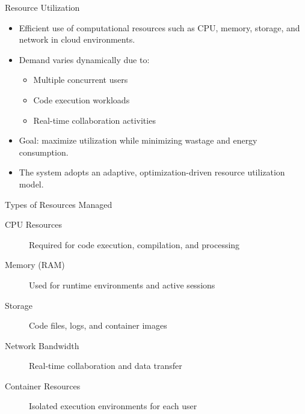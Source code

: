 \documentclass[aspectratio=169,11pt]{beamer}
\begin{document}
\begin{frame}{Resource Utilization}
  \begin{itemize}
    \item Efficient use of computational resources such as CPU, memory, storage, and network in cloud environments.
    \item Demand varies dynamically due to:
      \begin{itemize}
        \item Multiple concurrent users
        \item Code execution workloads
        \item Real-time collaboration activities
      \end{itemize}
    \item Goal: maximize utilization while minimizing wastage and energy consumption.
    \item The system adopts an adaptive, optimization-driven resource utilization model.
  \end{itemize}
\end{frame}

\begin{frame}{Types of Resources Managed}
  \begin{description}
    \item[CPU Resources] Required for code execution, compilation, and processing
    \item[Memory (RAM)] Used for runtime environments and active sessions
    \item[Storage] Code files, logs, and container images
    \item[Network Bandwidth] Real-time collaboration and data transfer
    \item[Container Resources] Isolated execution environments for each user
  \end{description}
\end{frame}
\end{document}
